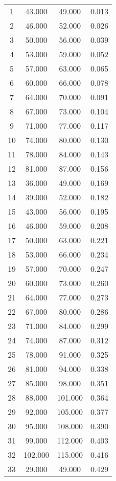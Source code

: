 % 
\begin{tabular}{cccc}
  \hline
  \hline
1 & 43.000 & 49.000 & 0.013 \\ 
  2 & 46.000 & 52.000 & 0.026 \\ 
  3 & 50.000 & 56.000 & 0.039 \\ 
  4 & 53.000 & 59.000 & 0.052 \\ 
  5 & 57.000 & 63.000 & 0.065 \\ 
  6 & 60.000 & 66.000 & 0.078 \\ 
  7 & 64.000 & 70.000 & 0.091 \\ 
  8 & 67.000 & 73.000 & 0.104 \\ 
  9 & 71.000 & 77.000 & 0.117 \\ 
  10 & 74.000 & 80.000 & 0.130 \\ 
  11 & 78.000 & 84.000 & 0.143 \\ 
  12 & 81.000 & 87.000 & 0.156 \\ 
  13 & 36.000 & 49.000 & 0.169 \\ 
  14 & 39.000 & 52.000 & 0.182 \\ 
  15 & 43.000 & 56.000 & 0.195 \\ 
  16 & 46.000 & 59.000 & 0.208 \\ 
  17 & 50.000 & 63.000 & 0.221 \\ 
  18 & 53.000 & 66.000 & 0.234 \\ 
  19 & 57.000 & 70.000 & 0.247 \\ 
  20 & 60.000 & 73.000 & 0.260 \\ 
  21 & 64.000 & 77.000 & 0.273 \\ 
  22 & 67.000 & 80.000 & 0.286 \\ 
  23 & 71.000 & 84.000 & 0.299 \\ 
  24 & 74.000 & 87.000 & 0.312 \\ 
  25 & 78.000 & 91.000 & 0.325 \\ 
  26 & 81.000 & 94.000 & 0.338 \\ 
  27 & 85.000 & 98.000 & 0.351 \\ 
  28 & 88.000 & 101.000 & 0.364 \\ 
  29 & 92.000 & 105.000 & 0.377 \\ 
  30 & 95.000 & 108.000 & 0.390 \\ 
  31 & 99.000 & 112.000 & 0.403 \\ 
  32 & 102.000 & 115.000 & 0.416 \\ 
  33 & 29.000 & 49.000 & 0.429 \\ 

\end{tabular}
